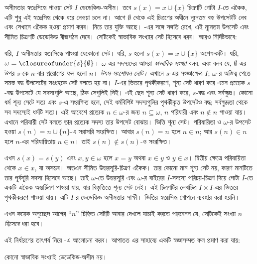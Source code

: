 \documentclass[../../../include/open-logic-section]{subfiles}
\begin{document}
অসীমতার স্বতঃসিদ্ধে পাওয়া সেট $I$ ডেডেকিন্ড-অসীম।
তবে $s(x) = x\cup \{x\}$ চিত্রণটি গোটা $I$-তে একৈক,
এটি শুধু এই স্বতঃসিদ্ধ থেকে ধরে নেওয়া চলে না। আগে
$\emptyset$ থেকে এই চিত্রণের অধীনে ন্যূনতম বদ্ধ উপসেটটি
নেব এবং সেখানে একৈক হওয়া প্রমাণ করব। নিচে তার যুক্তি আছে।
-এর
সঙ্গে সঙ্গতি রেখে, এই ন্যূনতম উপসেট এবং সীমিত চিত্রণটি
ডেডেকিন্ড বীজগঠন দেবে। সেটিকেই স্বাভাবিক সংখ্যার সেট
হিসেবে ধরব। আরও নির্দিষ্টভাবে:
\begin{defn}
ধরি, $I$ অসীমতার স্বতঃসিদ্ধে পাওয়া যেকোনো সেট। ধরি,
$s$ হলো $s(x) = x \cup \{x\}$ অপেক্ষকটি। ধরি,
$\omega = \closureofunder{s}{\emptyset}$। $\omega$-এর
সদস্যদের আমরা \emph{স্বাভাবিক সংখ্যা} বলব, এবং বলব যে,
$\emptyset$-এর উপর $s$-কে $n$-বার প্রয়োগের ফল হলো $n$।
\emph{উৎস-সংশোধন-নোট।} এখানে $s$-এর সংজ্ঞাক্ষেত্র $I$;
$\omega$-র অস্তিত্ব পেতে সমস্ত বদ্ধ উপসেটের সংগ্রহকে সেট
বলতে হয় না। $I$-এর ভিতরে পৃথকীকরণে, শূন্য সেট ধারণ করে এমন
প্রত্যেক $s$-বদ্ধ উপসেটে যে সদস্যগুলি আছে, ঠিক সেগুলিই নিই।
এই ছেদ শূন্য সেট ধারণ করে, $s$-বদ্ধ এবং সর্বক্ষুদ্র। কোনো ধর্ম
শূন্য সেটে সত্য এবং $s$-এ সংরক্ষিত হলে, সেই ধর্মবিশিষ্ট সদস্যগুলির
পৃথকীকৃত উপসেটও বদ্ধ; সর্বক্ষুদ্রতা থেকে সব সদস্যেই ধর্মটি সত্য।
এই আবেশে প্রত্যেক $n\in\omega$-র জন্য $n\subseteq\omega$,
$n$ পরিযায়ী এবং $n\notin n$ পাওয়া যায়। এখানে পরিযায়ী সেট
বলতে তার প্রত্যেক সদস্য তার উপসেট বোঝায়। ভিত্তি শূন্য সেট।
পরিযায়িতা ও $\omega$-র উপসেট হওয়া $s(n)=n\cup\{n\}$-এ
সরাসরি সংরক্ষিত। আবার $s(n)=n$ হলে $n\in n$; আর
$s(n)\in n$ হলে $n$-এর পরিযায়িতায় $n\in n$। তাই
$s(n)\notin s(n)$-ও সংরক্ষিত।
\par
এখন $s(x)=s(y)$ এবং $x,y\in\omega$ হলে $x=y$ অথবা
$x\in y$ ও $y\in x$। দ্বিতীয় ক্ষেত্রে পরিযায়িতা থেকে
$x\in x$, যা অসম্ভব। অতএব সীমিত উত্তরসূরি-চিত্রণ একৈক।
তার কোনো মান শূন্য সেট নয়, কারণ মানটিতে তার পূর্বসূরি সদস্য
হিসেবে আছে। তাই $\omega$-তে উত্তরসূরি এবং $\omega$-র বাইরের
$I$-সদস্যে পরিচয়-চিত্রণ দিয়ে গোটা $I$-তে একটি একৈক অন্তর্চিত্রণ
পাওয়া যায়, যার বিস্তৃতিতে শূন্য সেট নেই। এই চিত্রণটির লেখচিত্র
$I\times I$-এর ভিতরে পৃথকীকরণে পাওয়া যায়। এটি $I$-র
ডেডেকিন্ড-অসীমতার সাক্ষী। ভিত্তির স্বতঃসিদ্ধ গোপনে ব্যবহার করা হয়নি।
\end{defn}

এখন কয়েক অনুচ্ছেদ আগের ``$n$'' চিহ্নিত সেটটি আবার দেখলে
যাচাই করতে পারবেনন যে, সেটিকেই সংখ্যা $n$
\emph{হিসেবে} ধরা হবে।

এই নির্ধারণের তাৎপর্য নিয়ে
-এ আলোচনা করব। আপাতত এর সাহায্যে
একটি স্বজ্ঞাসম্মত ফল প্রমাণ করা যায়:

\begin{prop}
কোনো স্বাভাবিক সংখ্যাই ডেডেকিন্ড-অসীম নয়।
\end{prop}
\end{document}

